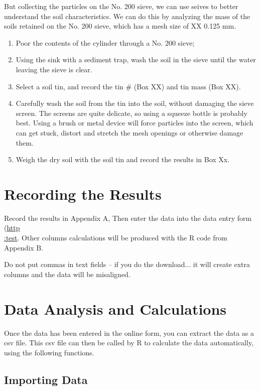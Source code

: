 \documentclass[12pt]{../SOP4_alpha}\usepackage[]{graphicx}\usepackage[]{xcolor}
\begin{document}
\NP But collecting the particles on the No. 200 sieve, we can use seives to better understand the soil characteristics. We can do this by analyzing the mass of the soils retained on the No. 200 sieve, which has a mesh size of XX 0.125 mm.  

\begin{enumerate}
	\item Poor the contents of the cylinder through a No. 200 sieve;
	\item Using the sink with a sediment trap, wash the soil in the sieve until the water leaving the sieve is clear. 
	\item Select a soil tin, and record the tin \# (Box XX) and tin mass (Box XX). 
	\item Carefully wash the soil from the tin into the soil, without damaging the sieve screen. The screens are quite delicate, so using a squeeze bottle is probably best. Using a brush or metal device will force particles into the screen, which can get stuck, distort and stretch the mesh openings or otherwise damage them. 
	\item Weigh the dry soil with the soil tin and record the results in Box Xx.
\end{enumerate}

\section{Recording the Results}

Record the results in Appendix A, Then enter the data into the data entry form (\href{test}{http\\:test}. Other columns calculations will be produced with the R code from Appendix B.  

Do not put commas in text fields -- if you do the download... it will create extra columns and the data will be misaligned.

\section{Data Analysis and Calculations}

Once the data has been entered in the online form, you can extract the data as a csv file. This csv file can then be called by R to calculate the data automatically, using the following functions. 

\subsection*{Importing Data}
\end{document}
